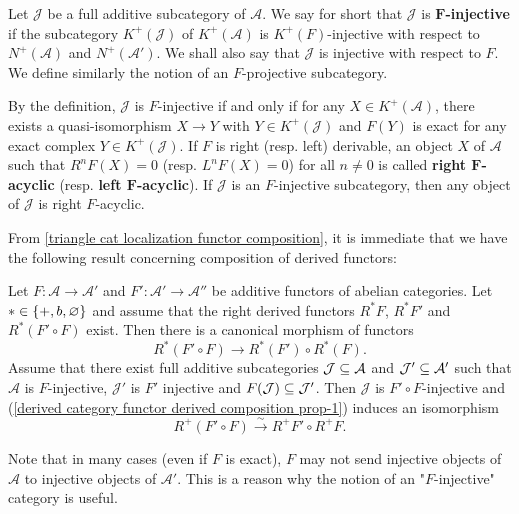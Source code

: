 \begin{definition}
Let $\mathcal{J}$ be a full additive subcategory of $\mathcal{A}$. We say for short that $\mathcal{J}$ is \textbf{$\bm{F}$-injective} if the subcategory $K^+(\mathcal{J})$ of $K^+(\mathcal{A})$ is $K^+(F)$-injective with respect to $N^+(\mathcal{A})$ and $N^+(\mathcal{A}')$. We shall also say that $\mathcal{J}$ is injective with respect to $F$. We define similarly the notion of an $F$-projective subcategory.
\end{definition}
By the definition, $\mathcal{J}$ is $F$-injective if and only if for any $X\in K^+(\mathcal{A})$, there exists a quasi-isomorphism $X\to Y$ with $Y\in K^+(\mathcal{J})$ and $F(Y)$ is exact for any exact complex $Y\in K^+(\mathcal{J})$. If $F$ is right (resp. left) derivable, an object $X$ of $\mathcal{A}$ such that $R^nF(X)=0$ (resp. $L^nF(X)=0$) for all $n\neq 0$ is called \textbf{right $\bm{F}$-acyclic} (resp. \textbf{left $\bm{F}$-acyclic}). If $\mathcal{J}$ is an $F$-injective subcategory, then any object of $\mathcal{J}$ is right $F$-acyclic.\par
From \cref{triangle cat localization functor composition}, it is immediate that we have the following result concerning composition of derived functors:
\begin{proposition}\label{derived category functor derived composition prop}
Let $F:\mathcal{A}\to\mathcal{A}'$ and $F':\mathcal{A}'\to\mathcal{A}''$ be additive functors of abelian categories. Let $*\in\{+,b,\varnothing\}$ and assume that the right derived functors $R^*F$, $R^*F'$ and $R^*(F'\circ F)$ exist. Then there is a canonical morphism of functors
\begin{equation}\label{derived category functor derived composition prop-1}
R^*(F'\circ F)\to R^*(F')\circ R^*(F).
\end{equation}
Assume that there exist full additive subcategories $\mathcal{J}\subseteq\mathcal{A}$ and $\mathcal{J}'\subseteq\mathcal{A}'$ such that $\mathcal{A}$ is $F$-injective, $\mathcal{J}'$ is $F'$ injective and $F(\mathcal{J})\subseteq\mathcal{J}'$. Then $\mathcal{J}$ is $F'\circ F$-injective and (\ref{derived category functor derived composition prop-1}) induces an isomorphism
\[R^+(F'\circ F)\stackrel{\sim}{\to} R^+F'\circ R^+F.\]
\end{proposition}
Note that in many cases (even if $F$ is exact), $F$ may not send injective objects of $\mathcal{A}$ to injective objects of $\mathcal{A}'$. This is a reason why the notion of an "$F$-injective" category is useful. 

